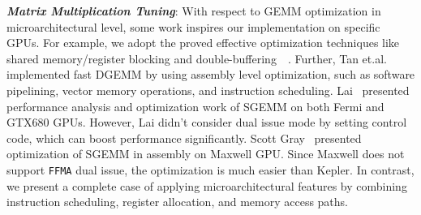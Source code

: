 {\em {\bf Matrix Multiplication Tuning}}: With respect to GEMM optimization in microarchitectural level, some work inspires our implementation 
on specific GPUs. For example, we adopt the proved effective optimization techniques like shared memory/register 
blocking and double-buffering~\cite{volkov}~\cite{tan}. Further, Tan et.al.~\cite{tan} implemented fast DGEMM by using 
assembly level optimization, such as software pipelining, vector memory operations, and instruction scheduling. 
Lai~\cite{lai} presented performance analysis and optimization work of SGEMM on both Fermi and GTX680 GPUs. However, 
Lai didn't consider dual issue mode by setting control code, which can boost performance significantly. Scott 
Gray~\cite{nervana_sgemm_wiki} presented optimization of SGEMM in assembly on Maxwell GPU. Since Maxwell does not 
support {\tt FFMA} dual issue, the optimization is much easier than
Kepler. In contrast, we present a complete case of applying microarchitectural features by combining instruction 
scheduling, register allocation, and memory access paths. 
